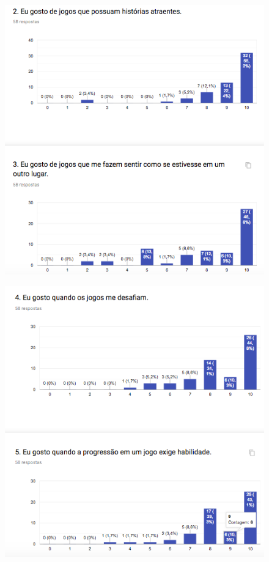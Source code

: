 \begin{apendicesenv}
\begin{figure}[h]
	\centering
	\includegraphics[keepaspectratio=true,scale=1]{figuras/r7.png}
\end{figure}

\begin{figure}[h]
	\centering
	\includegraphics[keepaspectratio=true,scale=1]{figuras/r8.png}
\end{figure}


\end{apendicesenv}
